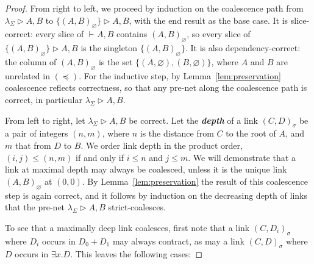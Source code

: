 \documentclass[UKenglish]{lipics-v2016}
\makeatletter
\theoremstyle{plain}
\newcommand\defn[1]{\textit{\textbf{#1}}}
\newcommand\+{+}
\renewcommand\*{\times}
\newcommand\dep{\preccurlyeq}
\newcommand\seq[3][]{{\vdash_{#1}}#2,#3}
\newcommand\net[3]{#1\triangleright #2,#3}
\newcommand\link[3][\sigma]{(#2,#3)_{#1}}
\newcommand\srr[1]{
  \ifx#1+\expandafter\@srr\else
  \ifx#1*\*\mathrm S\else
  \ifx#1!\forall\mathrm S\else
  \ifx#1?\exists\mathrm S\else 
  \ifx#11\mathrm{axS}\else
  #1\mathrm S  \fi\fi\fi\fi\fi
}
\newcommand\@srr[1]{+_{#1}\mathrm S}
\makeatother
\begin{document}
\begin{proof}
From right to left, we proceed by induction on the coalescence path from $\net{\lambda_\Sigma}AB$ to $\net{\{\link[\varnothing]AB\}}AB$, with the end result as the base case. It is slice-correct: every slice of $\seq AB$ contains $\link[\varnothing]AB$, so every slice of $\net{\{\link[\varnothing]AB\}}AB$ is the singleton $\{\link[\varnothing]AB\}$. It is also dependency-correct: the column of $\link[\varnothing]AB$ is the set $\{(A,\varnothing),(B,\varnothing)\}$, where $A$ and $B$ are unrelated in $(\dep)$. For the inductive step, by Lemma~\ref{lem:preservation} coalescence reflects correctness, so that any pre-net along the coalescence path is correct, in particular $\net{\lambda_\Sigma}AB$.

From left to right, let $\net{\lambda_\Sigma}AB$ be correct. Let the \defn{depth} of a link $\link CD$ be a pair of integers $(n,m)$, where $n$ is the distance from $C$ to the root of $A$, and $m$ that from $D$ to $B$. We order link depth in the product order, $(i,j)\leq(n,m)$ if and only if $i\leq n$ and $j\leq m$. We will demonstrate that a link at maximal depth may always be coalesced, unless it is the unique link $\link[\varnothing]AB$ at $(0,0)$. By Lemma~\ref{lem:preservation} the result of this coalescence step is again correct, and it follows by induction on the decreasing depth of links that the pre-net $\net{\lambda_\Sigma}AB$ strict-coalesces.

To see that a maximally deep link coalesces, first note that a link $\link C{D_i}$ where $D_i$ occurs in $D_0{\+}D_1$ may always contract, as may a link $\link CD$ where $D$ occurs in $\exists x.D$. This leaves the following cases:

\end{proof}
\end{document}
